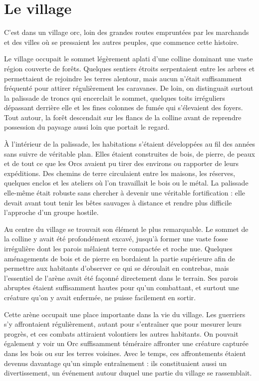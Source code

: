 \chapter{Le village}
\label{chap:le-village}

C'est dans un village orc, loin des grandes routes empruntées par les marchands
et des villes où se pressaient les autres peuples, que commence cette histoire.

Le village occupait le sommet légèrement aplati d'une colline dominant une
vaste région couverte de forêts. Quelques sentiers étroits serpentaient entre
les arbres et permettaient de rejoindre les terres alentour, mais aucun n'était
suffisamment fréquenté pour attirer régulièrement les caravanes. De loin, on
distinguait surtout la palissade de troncs qui encerclait le sommet, quelques
toits irréguliers dépassant derrière elle et les fines colonnes de fumée qui
s'élevaient des foyers. Tout autour, la forêt descendait sur les flancs de la
colline avant de reprendre possession du paysage aussi loin que portait le
regard.

À l'intérieur de la palissade, les habitations s'étaient développées au fil des
années sans suivre de véritable plan. Elles étaient construites de bois, de
pierre, de peaux et de tout ce que les Orcs avaient pu tirer des environs ou
rapporter de leurs expéditions. Des chemins de terre circulaient entre les
maisons, les réserves, quelques enclos et les ateliers où l'on travaillait le
bois ou le métal. La palissade elle-même était robuste sans chercher à devenir
une véritable fortification : elle devait avant tout tenir les bêtes sauvages
à distance et rendre plus difficile l'approche d'un groupe hostile.

Au centre du village se trouvait son élément le plus remarquable. Le sommet de
la colline y avait été profondément excavé, jusqu'à former une vaste fosse
irrégulière dont les parois mêlaient terre compactée et roche nue. Quelques
aménagements de bois et de pierre en bordaient la partie supérieure afin de
permettre aux habitants d'observer ce qui se déroulait en contrebas, mais
l'essentiel de l'arène avait été façonné directement dans le terrain. Ses
parois abruptes étaient suffisamment hautes pour qu'un combattant, et surtout
une créature qu'on y avait enfermée, ne puisse facilement en sortir.

Cette arène occupait une place importante dans la vie du village. Les guerriers
s'y affrontaient régulièrement, autant pour s'entraîner que pour mesurer leurs
progrès, et ces combats attiraient volontiers les autres habitants. On pouvait
également y voir un Orc suffisamment téméraire affronter une créature capturée
dans les bois ou sur les terres voisines. Avec le temps, ces affrontements
étaient devenus davantage qu'un simple entraînement : ils constituaient aussi
un divertissement, un événement autour duquel une partie du village se
rassemblait.

